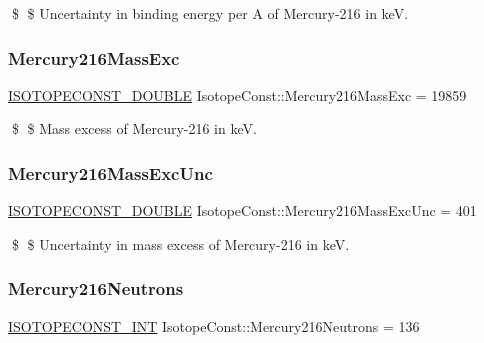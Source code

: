 \$ \$ Uncertainty in binding energy per A of Mercury-\/216 in keV. \mbox{\label{group___isotope_const-_mercury-_hg216_ga2f19ba890c9dc6efe0f838d891a76984}} 
\subsubsection{\texorpdfstring{Mercury216\+Mass\+Exc}{Mercury216MassExc}}
{\footnotesize\ttfamily \mbox{\hyperlink{group___isotope_const-_macros_ga8f45a7272ce02c0b4c65c44636ed719a}{I\+S\+O\+T\+O\+P\+E\+C\+O\+N\+S\+T\+\_\+\+D\+O\+U\+B\+LE}} Isotope\+Const\+::\+Mercury216\+Mass\+Exc = 19859}

\$ \$ Mass excess of Mercury-\/216 in keV. \mbox{\label{group___isotope_const-_mercury-_hg216_gaa339c355c151bf8f8e4bd25b4c59d7f2}} 
\subsubsection{\texorpdfstring{Mercury216\+Mass\+Exc\+Unc}{Mercury216MassExcUnc}}
{\footnotesize\ttfamily \mbox{\hyperlink{group___isotope_const-_macros_ga8f45a7272ce02c0b4c65c44636ed719a}{I\+S\+O\+T\+O\+P\+E\+C\+O\+N\+S\+T\+\_\+\+D\+O\+U\+B\+LE}} Isotope\+Const\+::\+Mercury216\+Mass\+Exc\+Unc = 401}

\$ \$ Uncertainty in mass excess of Mercury-\/216 in keV. \mbox{\label{group___isotope_const-_mercury-_hg216_ga832d7b9e6b2dd3e7ba93e77bca46995b}} 
\subsubsection{\texorpdfstring{Mercury216\+Neutrons}{Mercury216Neutrons}}
{\footnotesize\ttfamily \mbox{\hyperlink{group___isotope_const-_macros_ga5f18360b3e99483a35c32d789e62621c}{I\+S\+O\+T\+O\+P\+E\+C\+O\+N\+S\+T\+\_\+\+I\+NT}} Isotope\+Const\+::\+Mercury216\+Neutrons = 136}


